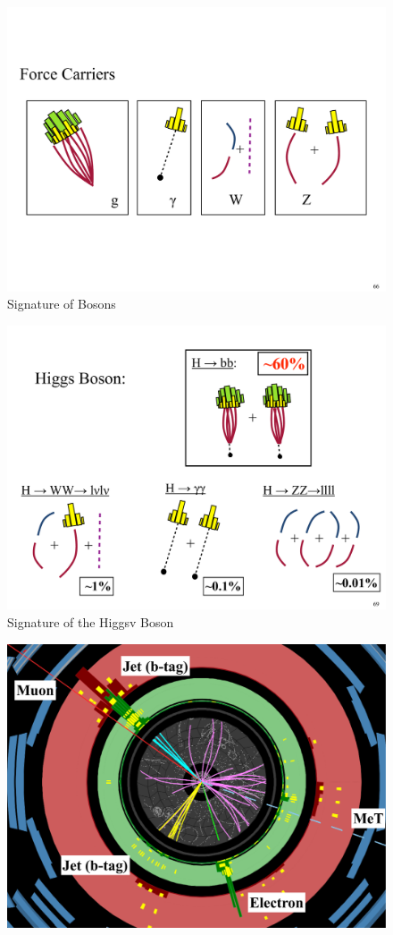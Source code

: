 {\begin{figure}[h]
\centering
\includegraphics[width=1.0\textwidth]{./Bosons.pdf}
\caption{Signature of Bosons}\label{fig:Bosons}
\end{figure}

\begin{figure}[h]
\centering
\includegraphics[width=1.0\textwidth]{./HiggsBoson.pdf}
\caption{Signature of the Higgsv Boson}\label{fig:HiggsBosons}
\end{figure}

\begin{figure}[h]
\centering
\includegraphics[width=1.0\textwidth]{./EventDisplayLabeled.pdf}
\end{figure}

}



